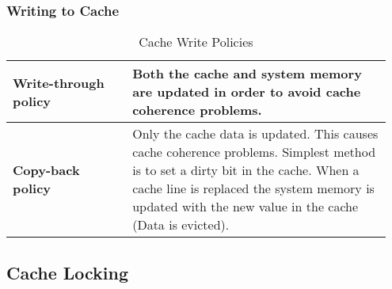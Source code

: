 		\subsubsection{Writing to Cache}
			\begin{table}[H]
				\centering
				\begin{tabular}{|p{0.3\linewidth}|p{0.65\linewidth}|}
					\hline
					\textbf{Write-through policy}
						& Both the cache and system memory are updated in order to avoid cache coherence problems.\\
					\hline
					\textbf{Copy-back policy}
						& Only the cache data is updated. This causes cache coherence problems. Simplest method is to set a dirty bit in the cache. When a cache line is replaced the system memory is updated with the new value in the cache (Data is evicted).\\
					\hline
				\end{tabular}
				\caption{Cache Write Policies}
			\end{table}
			
	\subsection{Cache Locking}
